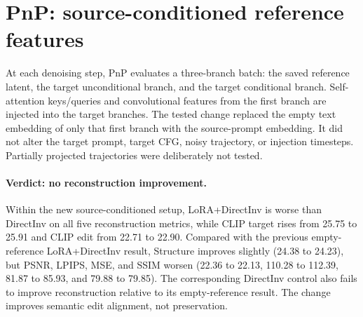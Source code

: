 \documentclass[10pt]{article}
\begin{document}
\section*{PnP: source-conditioned reference features}

At each denoising step, PnP evaluates a three-branch batch: the saved reference
latent, the target unconditional branch, and the target conditional branch.
Self-attention keys/queries and convolutional features from the first branch
are injected into the target branches. The tested change replaced the empty
text embedding of only that first branch with the source-prompt embedding. It
did not alter the target prompt, target CFG, noisy trajectory, or injection
timesteps. Partially projected trajectories were deliberately not tested.

\begin{table}[htbp]
  \centering
  \scriptsize
  \setlength{\tabcolsep}{2.5pt}
  \caption{PnP with its injected source/reference branch conditioned on the
  source prompt instead of the empty prompt.}
  \label{tab:pnp-source-reference}
\end{table}

\paragraph{Verdict: no reconstruction improvement.}
Within the new source-conditioned setup, LoRA+DirectInv is worse than DirectInv
on all five reconstruction metrics, while CLIP target rises from 25.75 to 25.91
and CLIP edit from 22.71 to 22.90. Compared with the previous empty-reference
LoRA+DirectInv result, Structure improves slightly (24.38 to 24.23), but PSNR,
LPIPS, MSE, and SSIM worsen (22.36 to 22.13, 110.28 to 112.39, 81.87 to 85.93,
and 79.88 to 79.85). The corresponding DirectInv control also fails to improve
reconstruction relative to its empty-reference result. The change improves
semantic edit alignment, not preservation.
\end{document}

